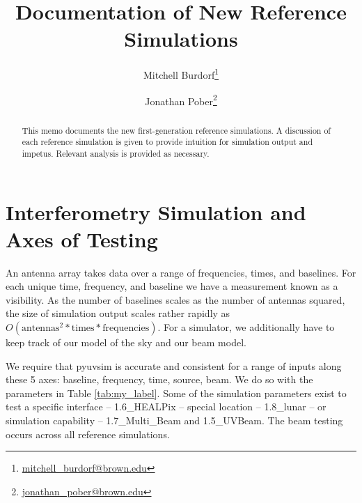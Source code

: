\documentclass{article}
\begin{document}
\title{\vspace{-1.5cm}Documentation of New Reference Simulations}

\author{
  Mitchell Burdorf\footnote{\href{mailto:mitchell_burdorf@brown.edu}{mitchell\_burdorf@brown.edu}}
  \and
  Jonathan Pober\footnote{\href{mailto:jonathan_pober@brown.edu}{jonathan\_pober@brown.edu}}
}

\maketitle

\vspace{-0.8cm}
\begin{abstract}
This memo documents the new first-generation reference simulations. A discussion of each reference simulation is given to provide intuition for simulation output and impetus. Relevant analysis is provided as necessary.
\end{abstract}

\section*{Interferometry Simulation and Axes of Testing}
An antenna array takes data over a range of frequencies, times, and baselines. For each unique time, frequency, and baseline we have a measurement known as a visibility. As the number of baselines scales as the number of antennas squared, the size of simulation output scales rather rapidly as $O(\text{antennas}^2 * \text{times} * \text{frequencies})$. For a simulator, we additionally have to keep track of our model of the sky and our beam model.

We require that pyuvsim is accurate and consistent for a range of inputs along these 5 axes: baseline, frequency, time, source, beam. We do so with the parameters in Table \ref{tab:my_label}. Some of the simulation parameters exist to test a specific interface -- 1.6\_HEALPix -- special location -- 1.8\_lunar -- or simulation capability -- 1.7\_Multi\_Beam and 1.5\_UVBeam. The beam testing occurs across all reference simulations.
\end{document}

